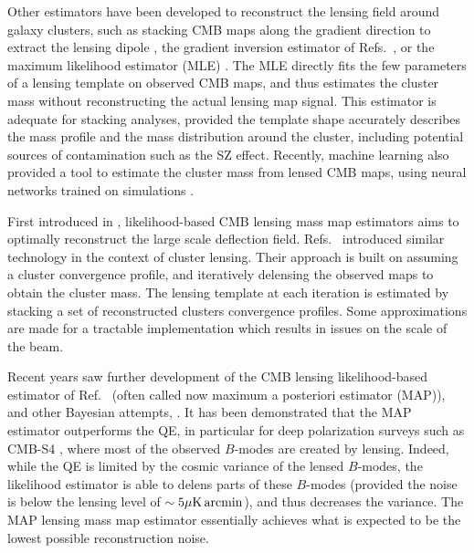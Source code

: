 \documentclass[prd, superscriptaddress, tightenlines, longbibliography, nofootinbib, eqsecnum, amsfonts, amsmath, floatfix, twocolumn, notitlepage]{revtex4-2}
\newcommand{\JC}[1]{\color{purple}{{JC:#1}}\color{black}\xspace}
\begin{document}
Other estimators have been developed to reconstruct the lensing field around galaxy clusters, such as stacking CMB maps along the gradient direction to extract the lensing dipole \cite{SPT:2019qkp, Levy:2023moy}, the gradient inversion estimator of Refs.~\cite{Horowitz:2017iql, Hadzhiyska:2019cle}, or the maximum likelihood estimator (MLE) \cite{Lewis:2005fq,Baxter:2014frs, Raghunathan:2017cle}.
The MLE directly fits the few parameters of a lensing template on observed CMB maps, and thus estimates the cluster mass without reconstructing the actual lensing map signal. This estimator is adequate for stacking analyses, provided the template shape accurately describes the mass profile and the mass distribution around the cluster, including potential sources of contamination such as the SZ effect.
Recently, machine learning also provided a tool to estimate the cluster mass from lensed CMB maps, using neural networks trained on simulations \cite{Caldeira:2018ojb, Gupta:2020him, Parker:2022uxh}.

First introduced in \cite{Hirata:2002jy, Hirata:2003ka}, likelihood-based CMB lensing mass map estimators aims to optimally reconstruct the large scale deflection field.
Refs.~\cite{ Yoo:2008bf, Yoo:2010jd} introduced similar technology in the context of cluster lensing.
Their approach is built on assuming a cluster convergence profile, and iteratively delensing the observed maps to obtain the cluster mass. The lensing template at each iteration is estimated by stacking a set of reconstructed clusters convergence profiles. Some approximations are made for a tractable implementation which results in issues on the scale of the beam\JC{Edited a bit this para}.

Recent years saw further development of the CMB lensing likelihood-based estimator of Ref.~\cite{Hirata:2002jy, Hirata:2003ka} (often called now maximum a posteriori estimator (MAP)), and other Bayesian attempts, \cite{Carron:2017mqf,Millea:2017fyd,Millea:2020cpw, Millea:2021had,Legrand:2021qdu,Aurlien:2022tlp,Legrand:2023jne,Reinecke:2023gtp}.
It has been demonstrated that the MAP estimator outperforms the QE, in particular for deep polarization surveys such as CMB-S4 \cite{CMB-S4:2016ple}, where most of the observed $B$-modes are created by lensing. Indeed, while the QE is limited by the cosmic variance of the lensed $B$-modes, the likelihood estimator is able to delens parts of these $B$-modes (provided the noise is below the lensing level of $\sim 5\mu\rm K \, arcmin$), and thus decreases the variance. The MAP lensing mass map estimator essentially achieves what is expected to be the lowest possible reconstruction noise.
\end{document}
